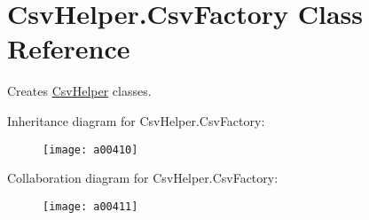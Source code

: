 \hypertarget{a00059}{\section{Csv\-Helper.\-Csv\-Factory Class Reference}
\label{a00059}
}


Creates \hyperlink{a00325}{Csv\-Helper} classes.  




Inheritance diagram for Csv\-Helper.\-Csv\-Factory\-:
\nopagebreak
\begin{figure}[H]
\begin{center}
\leavevmode
\texttt{[image: a00410]}
\end{center}
\end{figure}


Collaboration diagram for Csv\-Helper.\-Csv\-Factory\-:
\nopagebreak
\begin{figure}[H]
\begin{center}
\leavevmode
\texttt{[image: a00411]}
\end{center}
\end{figure}
